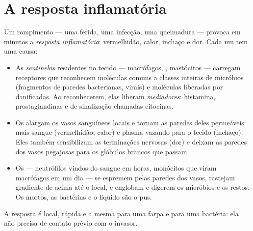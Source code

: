 \section{A resposta inflamatória}

\begin{proposition}\label{prop:g12:innate-immunity:inflammation}
Um rompimento --- uma ferida, uma infecção, uma queimadura --- provoca
em minutos a \emph{resposta inflamatória}: vermelhidão,
calor, inchaço e dor. Cada um tem uma causa:
\begin{itemize}
  \item As \emph{ sentinelas} residentes no tecido ---
        macrófagos, , mastócitos --- carregam
        receptores que reconhecem moléculas comuns a classes inteiras
        de micróbios (fragmentos de paredes bacterianas,  virais) e moléculas liberadas por 
        danificadas. Ao reconhecerem, elas liberam
        \emph{mediadores}: histamina,
        prostaglandinas e  de sinalização chamadas citocinas.
  \item Os  alargam os vasos sanguíneos locais e tornam as
        paredes deles permeáveis: mais sangue (vermelhidão, calor) e
        plasma vazando para o tecido (inchaço). Eles também
        sensibilizam as terminações nervosas (dor) e deixam as paredes
        dos vasos pegajosas para os glóbulos brancos que passam.
  \item Os \emph{} --- neutrófilos vindos do sangue em horas,
        monócitos que viram macrófagos em um dia --- se espremem pelas
        paredes dos vasos, rastejam gradiente de  acima até o
        local, e englobam e digerem os micróbios e os restos. Os
         mortos, as bactérias e o líquido são o pus.
\end{itemize}
A resposta é local, rápida e a mesma para uma farpa e para uma
bactéria: ela não precisa de contato prévio com o invasor.
\end{proposition}
